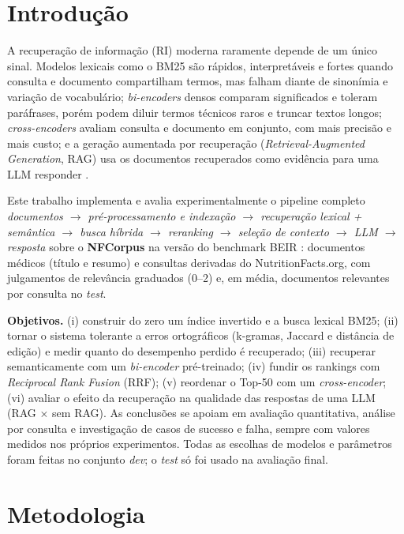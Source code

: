 \section{Introdução}
A recuperação de informação (RI) moderna raramente depende de um único sinal. Modelos lexicais como o BM25 são rápidos, interpretáveis e fortes quando consulta e documento compartilham termos, mas falham diante de sinonímia e variação de vocabulário; \emph{bi-encoders} densos comparam significados e toleram paráfrases, porém podem diluir termos técnicos raros e truncar textos longos; \emph{cross-encoders} avaliam consulta e documento em conjunto, com mais precisão e mais custo; e a geração aumentada por recuperação (\emph{Retrieval-Augmented Generation}, RAG) usa os documentos recuperados como evidência para uma LLM responder \cite{lewis2020rag}.

Este trabalho implementa e avalia experimentalmente o pipeline completo \emph{documentos $\rightarrow$ pré-processamento e indexação $\rightarrow$ recuperação lexical + semântica $\rightarrow$ busca híbrida $\rightarrow$ reranking $\rightarrow$ seleção de contexto $\rightarrow$ LLM $\rightarrow$ resposta} sobre o \textbf{NFCorpus} na versão do benchmark BEIR \cite{boteva2016nfcorpus,thakur2021beir}: \NDocs{} documentos médicos (título e resumo) e \NQueries{} consultas derivadas do NutritionFacts.org, com julgamentos de relevância graduados (0--2) e, em média, \AvgRelTest{} documentos relevantes por consulta no \emph{test}.

\textbf{Objetivos.} (i) construir do zero um índice invertido e a busca lexical BM25; (ii) tornar o sistema tolerante a erros ortográficos (k-gramas, Jaccard e distância de edição) e medir quanto do desempenho perdido é recuperado; (iii) recuperar semanticamente com um \emph{bi-encoder} pré-treinado; (iv) fundir os rankings com \emph{Reciprocal Rank Fusion} (RRF); (v) reordenar o Top-50 com um \emph{cross-encoder}; (vi) avaliar o efeito da recuperação na qualidade das respostas de uma LLM (RAG $\times$ sem RAG). As conclusões se apoiam em avaliação quantitativa, análise por consulta e investigação de casos de sucesso e falha, sempre com valores medidos nos próprios experimentos. Todas as escolhas de modelos e parâmetros foram feitas no conjunto \emph{dev}; o \emph{test} só foi usado na avaliação final.

\section{Metodologia}
